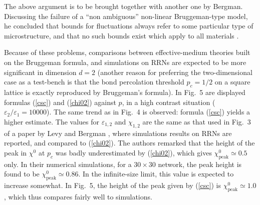 The above argument is to be brought together with another one
by Bergman. Discussing the failure of a ``non ambiguous''
non-linear Bruggeman-type model, he concluded that bounds
for fluctuations always refer to some particular type of
microstructure, and that no such bounds exist which apply
to all materials \cite{BERG89}.

Because of these problems, comparisons between
effective-medium theories built on the Bruggeman
formula, and simulations on RRNs are expected to
be more significant in dimension $d=2$ (another
reason for preferring the two-dimensional case
as a test-bench is that the bond percolation
threshold $p_c=1/2$ on a square lattice is exactly
reproduced by Bruggeman's formula). In Fig.\ 5 are
displayed formulas (\ref{csc}) and (\ref{chi02})
against $p$, in a high contrast situation
($\varepsilon_2/\varepsilon_1=10000$). The same
trend as in Fig.\ 4 is observed: formula (\ref{csc})
yields a higher estimate. The values for
$\varepsilon_{1,2}$ and $\chi_{1,2}$ are the
same as that used in Fig.\ 3 of a paper by Levy
and Bergman \cite{LEVY94}, where simulations results
on RRNs are reported, and compared to (\ref{chi02}).
The authors remarked that the height of the peak in
$\chi^0$ at $p_c$ was badly underestimated by (\ref{chi02}),
which gives $\chi^0_{\text{peak}}\simeq 0.5$ only. In
their numerical simulations, for a $30\times 30$ network,
the peak height is found to be
$\chi^0_{\text{peak}}\simeq 0.86$. In the
infinite-size limit, this value is expected
to increase somewhat. In Fig.\ 5, the height
of the peak given by (\ref{csc}) is
$\chi^0_{\text{peak}}\simeq 1.0$, which thus
compares fairly well to simulations.

